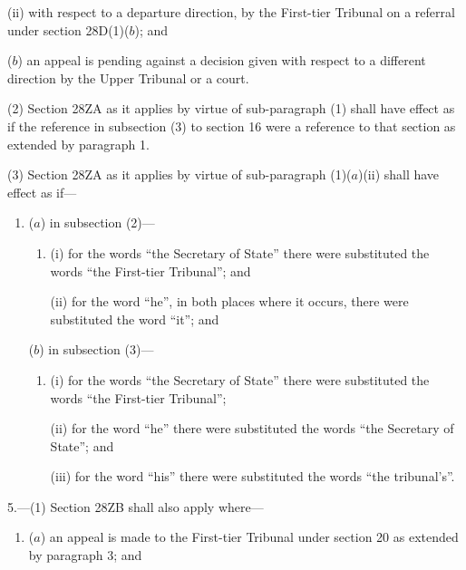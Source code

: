 \documentclass[12pt,a4paper]{article}
\begin{document}
{\begin{enumerate}
\begin{enumerate}
(ii) with respect to a departure direction, by the First-tier Tribunal on a referral under section 28D(1)($b$); and
\end{enumerate}

($b$) an appeal is pending against a decision given with respect to a different direction by the Upper Tribunal or a court.
\end{enumerate}

(2) Section 28ZA as it applies by virtue of sub-paragraph (1) shall have effect as if the reference in subsection (3) to section 16 were a reference to that section as extended by paragraph 1.

(3) Section 28ZA as it applies by virtue of sub-paragraph (1)($a$)(ii) shall have effect as if---
\begin{enumerate}\item[]
($a$) in subsection (2)---
\begin{enumerate}\item[]
(i) for the words “the Secretary of State” there were substituted the words “the First-tier Tribunal”; and

(ii) for the word “he”, in both places where it occurs, there were substituted the word “it”; and
\end{enumerate}

($b$) in subsection (3)---
\begin{enumerate}\item[]
(i) for the words “the Secretary of State” there were substituted the words “the First-tier Tribunal”;

(ii) for the word “he” there were substituted the words “the Secretary of State”; and

(iii) for the word “his” there were substituted the words “the tribunal's”.
\end{enumerate}
\end{enumerate}


\medskip

5.---(1) Section 28ZB shall also apply where---
\begin{enumerate}\item[]
($a$) an appeal is made to the First-tier Tribunal under section 20 as extended by paragraph 3; and


\end{enumerate}}
\end{document}
